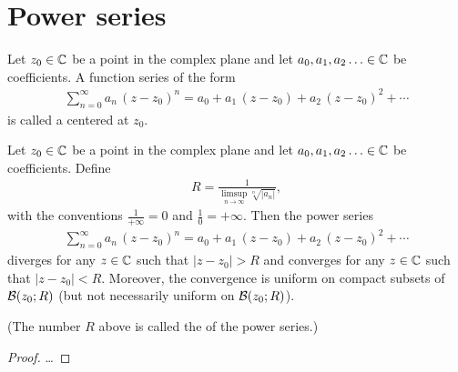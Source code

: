 \section{Power series}

\begin{definition}
  \label{def:power_series}
  Let $z_0 \in \bC$ be a point in the complex plane
  and let $a_0,a_1,a_2\ldots \in \bC$ be coefficients.
  A function series of the form
  \begin{align*}
  \sum_{n=0}^\infty a_n \, (z-z_0)^n
    = a_0 + a_1 \, (z - z_0) + a_2 \, (z - z_0)^2 + \cdots
  \end{align*}
  is called a  centered at $z_0$.
\end{definition}

\begin{lemma}
  \label{lem:radius_of_convergence}
  Let $z_0 \in \bC$ be a point in the complex plane
  and let $a_0,a_1,a_2\ldots \in \bC$ be coefficients.
  Define
  \begin{align*}
    R = \frac{1}{\limsup_{n \to \infty} \sqrt[n]{|a_n|}} ,
  \end{align*}
  with the conventions $\frac{1}{+\infty}=0$ and $\frac{1}{0} = +\infty$.
  Then the power series
  \begin{align*}
    \sum_{n=0}^\infty a_n \, (z-z_0)^n
      = a_0 + a_1 \, (z - z_0) + a_2 \, (z - z_0)^2 + \cdots
  \end{align*}
  diverges for any $z \in \bC$ such that $|z-z_0| > R$
  and converges for any $z \in \bC$ such that $|z-z_0| < R$.
  Moreover, the convergence is uniform on compact subsets
  of $\BallRC{R}{z_0}$ (but not necessarily uniform on $\BallRC{R}{z_0}$).

  (The number $R$ above is called the 
  of the power series.)
\end{lemma}
\begin{proof}
  \ldots
\end{proof}


